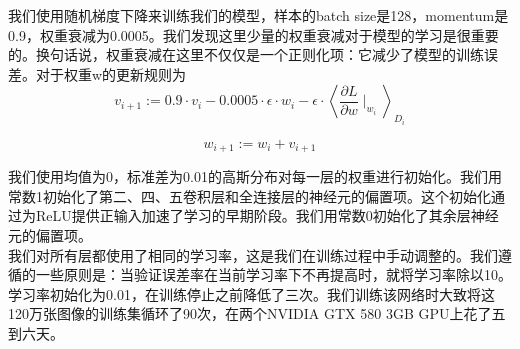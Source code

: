 我们使用随机梯度下降来训练我们的模型，样本的batch size是128，momentum是0.9，权重衰减为0.0005。我们发现这里少量的权重衰减对于模型的学习是很重要的。换句话说，权重衰减在这里不仅仅是一个正则化项：它减少了模型的训练误差。对于权重w的更新规则为\\
$$
v_{i+1} := 0.9 \cdot v_{i} - 0.0005\cdot \epsilon \cdot w_{i}-\epsilon \cdot \left \langle \frac{\partial L}{\partial w}\mid _{w_{i}} \right \rangle _{D_{i}}
$$

$$
w_{i+1}:=w_{i}+v_{i+1}
$$


我们使用均值为0，标准差为0.01的高斯分布对每一层的权重进行初始化。我们用常数1初始化了第二、四、五卷积层和全连接层的神经元的偏置项。这个初始化通过为ReLU提供正输入加速了学习的早期阶段。我们用常数0初始化了其余层神经元的偏置项。\\

我们对所有层都使用了相同的学习率，这是我们在训练过程中手动调整的。我们遵循的一些原则是：当验证误差率在当前学习率下不再提高时，就将学习率除以10。学习率初始化为0.01，在训练停止之前降低了三次。我们训练该网络时大致将这120万张图像的训练集循环了90次，在两个NVIDIA GTX 580 3GB GPU上花了五到六天。\\

